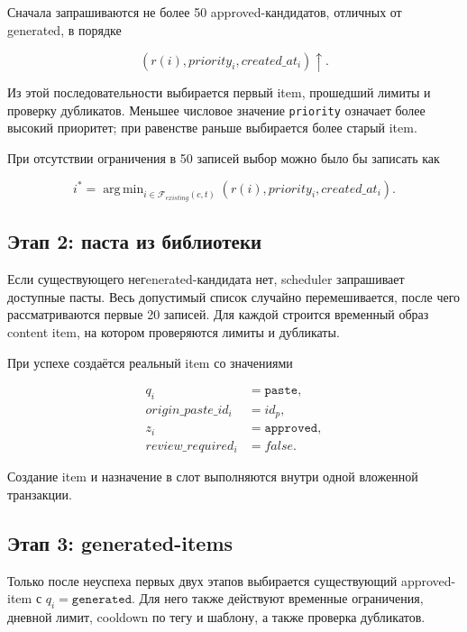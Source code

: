 \documentclass[12pt,a4paper]{article}
\DeclareMathOperator*{\argminop}{arg\,min}
\newcommand{\Status}[1]{\texttt{#1}}
\newcommand{\Field}[1]{\texttt{#1}}
\newcommand{\Source}[1]{\texttt{#1}}
\begin{document}
Сначала запрашиваются не более 50 approved-кандидатов, отличных от generated,
в порядке

\begin{equation}
  (r(i),priority_i,created\_at_i)\uparrow.
  \label{eq:candidate-order}
\end{equation}

Из этой последовательности выбирается первый item, прошедший лимиты и проверку
дубликатов. Меньшее числовое значение \Field{priority} означает более высокий
приоритет; при равенстве раньше выбирается более старый item.

При отсутствии ограничения в 50 записей выбор можно было бы записать как

\begin{equation}
  i^*=\argminop_{i\in\mathcal{F}_{existing}(c,t)}
  (r(i),priority_i,created\_at_i).
\end{equation}

\subsection{Этап 2: паста из библиотеки}

Если существующего негenerated-кандидата нет, scheduler запрашивает доступные
пасты. Весь допустимый список случайно перемешивается, после чего рассматриваются
первые 20 записей. Для каждой строится временный образ content item, на котором
проверяются лимиты и дубликаты.

При успехе создаётся реальный item со значениями

\begin{align}
  q_i&=\Source{paste},\\
  origin\_paste\_id_i&=id_p,\\
  z_i&=\Status{approved},\\
  review\_required_i&=false.
\end{align}

Создание item и назначение в слот выполняются внутри одной вложенной транзакции.

\subsection{Этап 3: generated-items}

Только после неуспеха первых двух этапов выбирается существующий approved-item с
$q_i=\Source{generated}$. Для него также действуют временные ограничения,
дневной лимит, cooldown по тегу и шаблону, а также проверка дубликатов.
\end{document}
